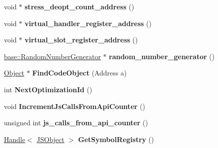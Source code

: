 \begin{DoxyCompactItemize}
\item 
void $\ast$ {\bfseries stress\+\_\+deopt\+\_\+count\+\_\+address} ()\hypertarget{classv8_1_1internal_1_1_isolate_a589c3f6e58352ba9ec247b59eafd27a8}{}\label{classv8_1_1internal_1_1_isolate_a589c3f6e58352ba9ec247b59eafd27a8}

\item 
void $\ast$ {\bfseries virtual\+\_\+handler\+\_\+register\+\_\+address} ()\hypertarget{classv8_1_1internal_1_1_isolate_af53a892229d433fd243d9ab95ef31c52}{}\label{classv8_1_1internal_1_1_isolate_af53a892229d433fd243d9ab95ef31c52}

\item 
void $\ast$ {\bfseries virtual\+\_\+slot\+\_\+register\+\_\+address} ()\hypertarget{classv8_1_1internal_1_1_isolate_adfff3009e0f1b781330caed565c27db1}{}\label{classv8_1_1internal_1_1_isolate_adfff3009e0f1b781330caed565c27db1}

\item 
\hyperlink{classv8_1_1base_1_1_random_number_generator}{base\+::\+Random\+Number\+Generator} $\ast$ {\bfseries random\+\_\+number\+\_\+generator} ()\hypertarget{classv8_1_1internal_1_1_isolate_aafb30a5fed0f8d9433be11ca8faefc8d}{}\label{classv8_1_1internal_1_1_isolate_aafb30a5fed0f8d9433be11ca8faefc8d}

\item 
\hyperlink{classv8_1_1internal_1_1_object}{Object} $\ast$ {\bfseries Find\+Code\+Object} (Address a)\hypertarget{classv8_1_1internal_1_1_isolate_a4057faf8ad16397b1260633a12408660}{}\label{classv8_1_1internal_1_1_isolate_a4057faf8ad16397b1260633a12408660}

\item 
int {\bfseries Next\+Optimization\+Id} ()\hypertarget{classv8_1_1internal_1_1_isolate_ae52f2af4504de1a6db0e798f2887ca2f}{}\label{classv8_1_1internal_1_1_isolate_ae52f2af4504de1a6db0e798f2887ca2f}

\item 
void {\bfseries Increment\+Js\+Calls\+From\+Api\+Counter} ()\hypertarget{classv8_1_1internal_1_1_isolate_a427486ba51602e69451daca7d6216341}{}\label{classv8_1_1internal_1_1_isolate_a427486ba51602e69451daca7d6216341}

\item 
unsigned int {\bfseries js\+\_\+calls\+\_\+from\+\_\+api\+\_\+counter} ()\hypertarget{classv8_1_1internal_1_1_isolate_af6713dfc6e36d1e0b7550b7703a9e8a7}{}\label{classv8_1_1internal_1_1_isolate_af6713dfc6e36d1e0b7550b7703a9e8a7}

\item 
\hyperlink{classv8_1_1internal_1_1_handle}{Handle}$<$ \hyperlink{classv8_1_1internal_1_1_j_s_object}{J\+S\+Object} $>$ {\bfseries Get\+Symbol\+Registry} ()\hypertarget{classv8_1_1internal_1_1_isolate_ab8fb160ae28ebe2e3f9472139c2f4b12}{}\label{classv8_1_1internal_1_1_isolate_ab8fb160ae28ebe2e3f9472139c2f4b12}


\end{DoxyCompactItemize}

